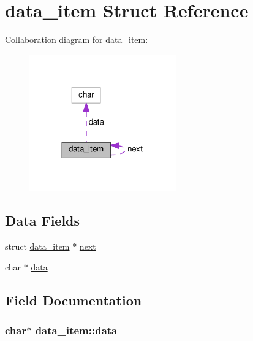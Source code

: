 \hypertarget{structdata__item}{}\section{data\+\_\+item Struct Reference}
\label{structdata__item}


Collaboration diagram for data\+\_\+item\+:
\nopagebreak
\begin{figure}[H]
\begin{center}
\leavevmode
\includegraphics[width=179pt]{structdata__item__coll__graph}
\end{center}
\end{figure}
\subsection*{Data Fields}
\begin{DoxyCompactItemize}
\item 
struct \hyperlink{structdata__item}{data\+\_\+item} $\ast$ \hyperlink{structdata__item_a82d24fd484892bea951369356be2fa2b}{next}
\item 
char $\ast$ \hyperlink{structdata__item_aa0c46a17c40abfd26697e006aed733e1}{data}
\end{DoxyCompactItemize}


\subsection{Field Documentation}
\subsubsection[{\texorpdfstring{data}{data}}]{\setlength{\rightskip}{0pt plus 5cm}char$\ast$ data\+\_\+item\+::data}\hypertarget{structdata__item_aa0c46a17c40abfd26697e006aed733e1}{}\label{structdata__item_aa0c46a17c40abfd26697e006aed733e1}
